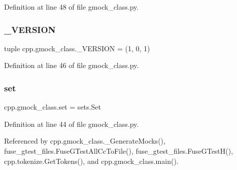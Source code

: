 Definition at line 48 of file gmock\+\_\+class.\+py.

\mbox{\label{namespacecpp_1_1gmock__class_ae5d7185c5f485142460e91de1394283c}} 
\subsubsection{\texorpdfstring{\+\_\+\+V\+E\+R\+S\+I\+ON}{\_VERSION}}
{\footnotesize\ttfamily tuple cpp.\+gmock\+\_\+class.\+\_\+\+V\+E\+R\+S\+I\+ON = (1, 0, 1)\hspace{0.3cm}{\ttfamily [private]}}



Definition at line 46 of file gmock\+\_\+class.\+py.

\mbox{\label{namespacecpp_1_1gmock__class_a2157e96eee0b4bf9ca6d195ab76f59c2}} 
\subsubsection{\texorpdfstring{set}{set}}
{\footnotesize\ttfamily cpp.\+gmock\+\_\+class.\+set = sets.\+Set}



Definition at line 44 of file gmock\+\_\+class.\+py.



Referenced by cpp.\+gmock\+\_\+class.\+\_\+\+Generate\+Mocks(), fuse\+\_\+gtest\+\_\+files.\+Fuse\+G\+Test\+All\+Cc\+To\+File(), fuse\+\_\+gtest\+\_\+files.\+Fuse\+G\+Test\+H(), cpp.\+tokenize.\+Get\+Tokens(), and cpp.\+gmock\+\_\+class.\+main().

